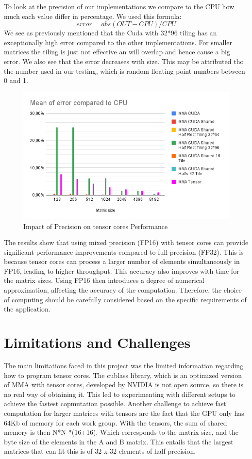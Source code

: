 \documentclass[conference]{IEEEtran}
\begin{document}
  To look at the precision of our implementations we compare to the CPU how much each value differ in percentage. We used this formula:
  \[error = abs(OUT - CPU) / CPU \]
  We see as previously mentioned that the Cuda with 32*96 tiling has an exceptionally high error compared to the other implementations.
  For smaller matrices the tiling is just not effective an will overlap and hence cause a big error. We also see that the error decreases with size.
  This may be attributed tho the number used in our testing, which is random floating point numbers between 0 and 1. 
  \begin{figure}[htbp]
    \centering
    \includegraphics[scale=0.42]{figures/Mean of error compared to CPU.png}
    \caption{Impact of Precision on tensor cores Performance}
    \label{fig:precision-impact}
  \end{figure}
  
  The results show that using mixed precision (FP16) with tensor cores can provide significant performance improvements compared to full precision (FP32).
  This is because tensor cores can process a larger number of elements simultaneously in FP16,
  leading to higher throughput. This accuracy also improves with time for the matrix sizes.
  Using FP16 then introduces a degree of numerical approximation, affecting the accuracy of the computation.
  Therefore, the choice of computing should be carefully considered based on the specific
  requirements of the application. 
  
  
  \section{Limitations and Challenges}\label{sec:limitations-challenges}
  The main limitations faced in this project was the limited information regarding how to program tensor cores.
  The cublass library, which is an optimized version of MMA with tensor cores, developed by NVIDIA is not open source,
  so there is no real way of obtaining it. This led to experimenting with different setups to achieve the fastest copmutation possible.
  Another challenge to achieve fast computation for larger matrices with tensors are the fact that the GPU 
  only has 64Kb of memory for each work group. With the tensors, the sum of shared memory is then N*N *(16+16).
  Which corresponds to the matrix size, and the byte size of the elements in the A and B matrix. This entails that the 
  largest matrices that can fit this is of 32 x 32 elements of half precision.
\end{document}
